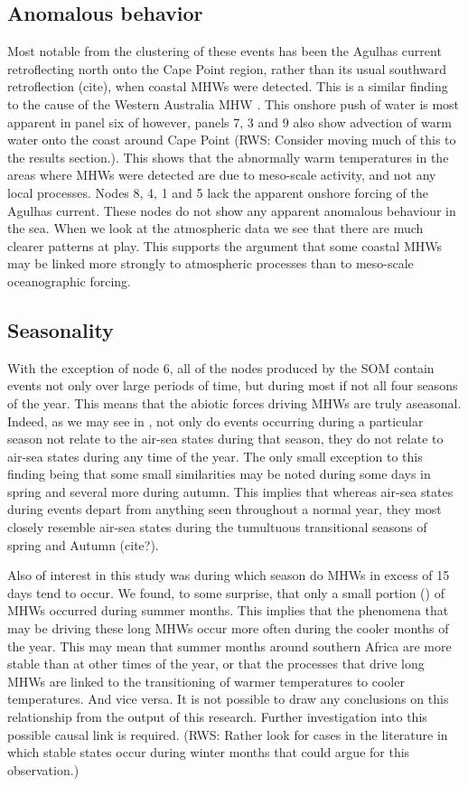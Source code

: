 \documentclass[a4paper,10pt,review]{elsarticle}
\begin{document}
\subsection{Anomalous behavior}
Most notable from the clustering of these events has been the Agulhas current retroflecting north onto the Cape Point region, rather than its usual southward retroflection (cite), when coastal MHWs were detected. This is a similar finding to the cause of the Western Australia MHW \citep{Feng2013, Benthuysen2014}. This onshore push of water is most apparent in panel six of  however, panels 7, 3 and 9 also show advection of warm water onto the coast around Cape Point (RWS: Consider moving much of this to the results section.). This shows that the abnormally warm temperatures in the areas where MHWs were detected are due to meso-scale activity, and not any local processes. Nodes 8, 4, 1 and 5 lack the apparent onshore forcing of the Agulhas current. These nodes do not show any apparent anomalous behaviour in the sea. When we look at the atmospheric data we see that there are much clearer patterns at play. This supports the argument that some coastal MHWs may be linked more strongly to atmospheric processes than to meso-scale oceanographic forcing.

\subsection{Seasonality}
With the exception of node 6, all of the nodes produced by the SOM contain events not only over large periods of time, but during most if not all four seasons of the year. This means  that the abiotic forces driving MHWs are truly aseasonal. Indeed, as we may see in , not only do events occurring during a particular season not relate to the air-sea states during that season, they do not relate to air-sea states during any time of the year. The only small exception to this finding being that some small similarities may be noted during some days in spring and several more during autumn. This implies that whereas air-sea states during events depart from anything seen throughout a normal year, they most closely resemble air-sea states during the tumultuous transitional seasons of spring and Autumn (cite?).

Also of interest in this study was during which season do MHWs in excess of 15 days tend to occur. We found, to some surprise, that only a small portion () of MHWs occurred during summer months. This implies that the phenomena that may be driving these long MHWs occur more often during the cooler months of the year. This may mean that summer months around southern Africa are more stable than at other times of the year, or that the processes that drive long MHWs are linked to the transitioning of warmer temperatures to cooler temperatures. And vice versa. It is not possible to draw any conclusions on this relationship from the output of this research. Further investigation into this possible causal link is required. (RWS: Rather look for cases in the literature in which stable states occur during winter months that could argue for this observation.)
\end{document}
